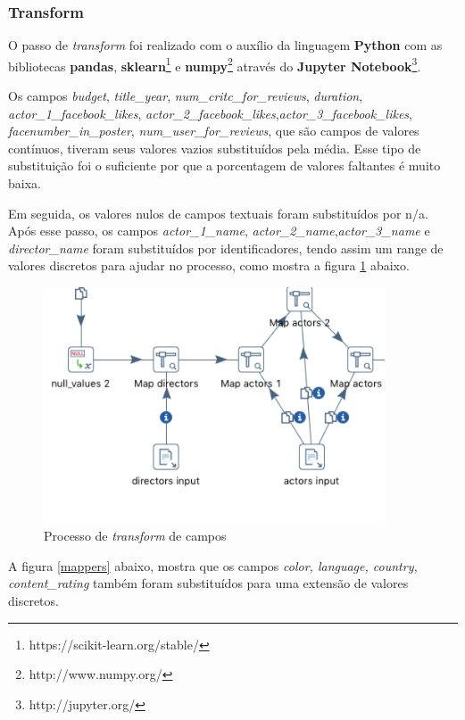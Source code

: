 \subsubsection{Transform}
O passo de \textit{transform} foi realizado com o auxílio da linguagem \textbf{Python} com as bibliotecas \textbf{pandas}, \textbf{sklearn}\footnote{https://scikit-learn.org/stable/} e \textbf{numpy}\footnote{http://www.numpy.org/} através do \textbf{Jupyter Notebook}\footnote{http://jupyter.org/}.

Os campos \textit{budget}, \textit{title\_year}, \textit{num\_critc\_for\_reviews}, \textit{duration}, \textit{actor\_1\_facebook\_likes}, \textit{actor\_2\_facebook\_likes},\textit{actor\_3\_facebook\_likes}, \textit{facenumber\_in\_poster}, \textit{num\_user\_for\_reviews}, que são campos de valores contínuos, tiveram seus valores vazios substituídos pela média. Esse tipo de substituição foi o suficiente por que a porcentagem de valores faltantes é muito baixa.

Em seguida, os valores nulos de campos textuais foram substituídos por n/a. Após esse passo, os campos \textit{actor\_1\_name}, \textit{actor\_2\_name},\textit{actor\_3\_name} e \textit{director\_name} foram substituídos por identificadores, tendo assim um range de valores discretos para ajudar no processo, como mostra a figura \ref{nullAndNames} abaixo.

\begin{figure}[H]
\centering
\includegraphics[height=7cm]{imagens/null_and_names.png}
\caption{Processo de \textit{transform} de campos}
\label{nullAndNames}
\end{figure}

A figura \ref{mappers} abaixo, mostra que os campos \textit{color, language, country, content\_rating} também foram substituídos para uma extensão de valores discretos.

